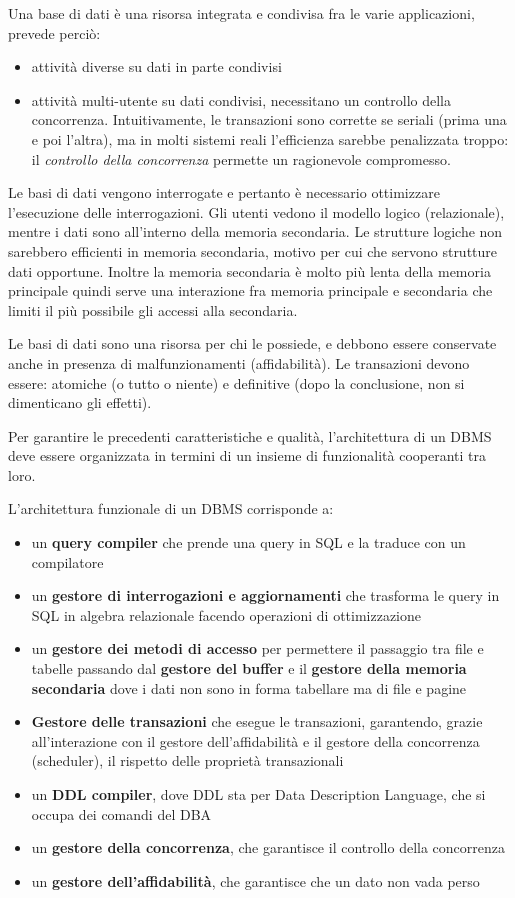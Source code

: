Una base di dati è una risorsa integrata e condivisa fra le varie applicazioni, prevede perciò:
\begin{itemize}
    \item attività diverse su dati in parte condivisi
    \item attività multi-utente su dati condivisi, necessitano un controllo della concorrenza. Intuitivamente, le transazioni sono corrette se seriali (prima una e poi l'altra), ma in molti sistemi reali l'efficienza sarebbe penalizzata troppo: il \textit{controllo della concorrenza} permette un ragionevole compromesso.
    
\end{itemize}

Le basi di dati vengono interrogate e pertanto è necessario ottimizzare l’esecuzione delle interrogazioni.
Gli utenti vedono il modello logico (relazionale), mentre i dati sono all'interno della memoria secondaria. Le strutture logiche non sarebbero efficienti in memoria secondaria, motivo per cui che servono strutture dati opportune. Inoltre la memoria secondaria è molto più lenta della memoria principale quindi serve una interazione fra memoria principale e secondaria che limiti il più possibile gli accessi alla secondaria. 
 
Le basi di dati sono una risorsa per chi le possiede, e debbono essere conservate anche in presenza di malfunzionamenti (affidabilità).
Le transazioni devono essere: atomiche (o tutto o niente) e definitive (dopo la conclusione, non si dimenticano gli effetti).

Per garantire le precedenti caratteristiche e qualità, l’architettura di un DBMS deve essere organizzata in termini di un insieme di funzionalità cooperanti tra loro.

L'architettura funzionale di un DBMS corrisponde a:
\begin{itemize}
  \item un \textbf{query compiler} che prende una query in SQL e la traduce con
  un compilatore
  \item un \textbf{gestore di interrogazioni e aggiornamenti} che trasforma le
  query in SQL in algebra relazionale facendo operazioni di ottimizzazione
  \item un \textbf{gestore dei metodi di accesso} per permettere il passaggio
  tra file e tabelle passando dal \textbf{gestore del buffer} e il
  \textbf{gestore della memoria secondaria} dove i dati non sono in forma
  tabellare ma di file e pagine
  \item \textbf{Gestore delle transazioni} che esegue le transazioni, garantendo, grazie all’interazione con il gestore dell’affidabilità e il gestore della concorrenza (scheduler), il rispetto delle proprietà transazionali
  \item un \textbf{DDL compiler}, dove DDL sta per Data Description Language,
  che si occupa dei comandi del DBA
  \item un \textbf{gestore della concorrenza}, che garantisce il controllo della
  concorrenza
  \item un \textbf{gestore dell'affidabilità}, che garantisce che un dato non
  vada perso
\end{itemize}

